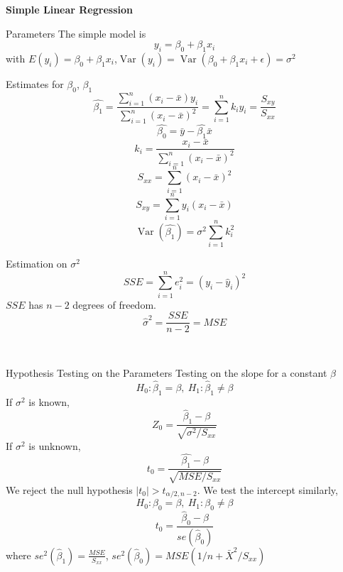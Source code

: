 \documentclass{article}
\title{}
\DeclareMathOperator{\Var}{Var}
\begin{document}
\begin{center}{\large{\textbf{Simple Linear Regression}}}\\
\end{center}




\begin{multicols*}{3}

    \begin{blackbox}{Parameters}
        The simple model is \\[-3ex]
        \[y_i = \beta_0 + \beta_1x_i\]
        with $E(y_i) = \beta_0 + \beta_1x_i$,$\Var(y_i) = \Var(\beta_0 + \beta_1x_i + \epsilon) = \sigma^2$
        \begin{redbox}{Estimates for $\beta_0$, $\beta_1$}
            \[\hat{\beta_1}= \frac{\sum_{i=1}^n(x_i - \bar{x})y_i}{\sum_{i=1}^n (x_i - \bar{x})^2} = \sum_{i=1}^n k_iy_i = \frac{S_{xy}}{S_{xx}}\]
            \[\hat{\beta_0} = \bar{y} - \hat{\beta_1}\bar{x}\]
            \[k_i = \frac{x_i - \bar{x}}{\sum_{i=1}^n(x_i - \bar{x})^2}\]
            \[S_{xx} = \sum_{i=1}^n (x_i - \bar{x})^2\]
            \[S_{xy} = \sum_{i=1}^n y_i(x_i - \bar{x})\]
            \[\Var(\hat{\beta_1}) = \sigma^2\sum_{i=1}^nk_i^2\]
        \end{redbox}
        \begin{bluebox}{Estimation on $\sigma^2$}
            \[SSE = \sum_{i=1}^ne_i^2 = (y_i-\hat{y}_i)^2\]
            $SSE$ has $n-2$ degrees of freedom.
            \[\hat{\sigma}^2 = \frac{SSE}{n-2} = MSE\]
        \end{bluebox}\\[-2ex]
    \end{blackbox}
    \begin{blackbox}{Hypothesis Testing on the Parameters}
        Testing on the slope for a constant $\beta$
        \[H_0: \hat{\beta}_1 = \beta, \ H_1: \hat{\beta}_1 \neq \beta\]
        If $\sigma^2$ is known,\\[-3.7ex]
        \[Z_0 = \frac{\hat{\beta}_1 - \beta}{\sqrt{\sigma^2/S_{xx}}}\]
        If $\sigma^2$ is unknown,\\[-4ex]
        \[t_0 = \frac{\hat{\beta_1} - \beta}{\sqrt{MSE/S_{xx}}}\]
        We reject the null hypothesis $|t_0| > t_{\alpha/2, n-2}$. We test the intercept similarly,\\[-2ex]
        \[H_0: \beta_0 = \beta, \ H_1: \beta_0 \neq \beta\]
        \[t_0 = \frac{\hat{\beta}_0 -  \beta}{se(\hat{\beta}_0)}\]
        where $se^2(\hat{\beta}_1) = \frac{MSE}{S_{xx}}$, $se^2(\hat{\beta}_0) = MSE(1/n + \bar{X}^2/S_{xx})$

\end{blackbox}
\end{multicols*}
\end{document}
